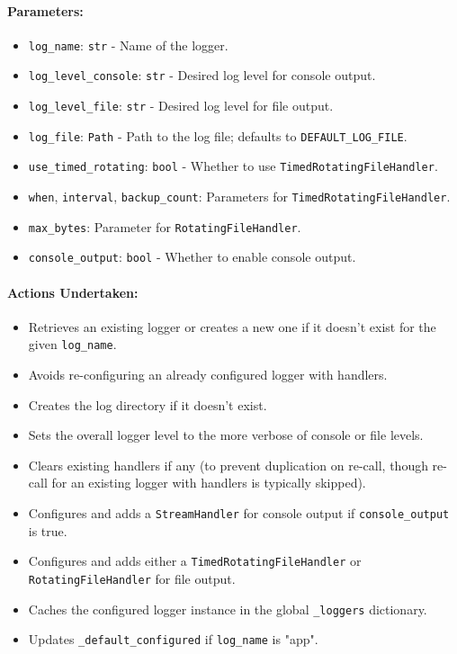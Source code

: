 \documentclass{article}
\begin{document}
\paragraph{Parameters:}
\begin{itemize}
    \item \texttt{log\_name}: \texttt{str} - Name of the logger.
    \item \texttt{log\_level\_console}: \texttt{str} - Desired log level for console output.
    \item \texttt{log\_level\_file}: \texttt{str} - Desired log level for file output.
    \item \texttt{log\_file}: \texttt{Path} - Path to the log file; defaults to \texttt{DEFAULT\_LOG\_FILE}.
    \item \texttt{use\_timed\_rotating}: \texttt{bool} - Whether to use \texttt{TimedRotatingFileHandler}.
    \item \texttt{when}, \texttt{interval}, \texttt{backup\_count}: Parameters for \texttt{TimedRotatingFileHandler}.
    \item \texttt{max\_bytes}: Parameter for \texttt{RotatingFileHandler}.
    \item \texttt{console\_output}: \texttt{bool} - Whether to enable console output.
\end{itemize}
\paragraph{Actions Undertaken:}
\begin{itemize}
    \item Retrieves an existing logger or creates a new one if it doesn't exist for the given \texttt{log\_name}.
    \item Avoids re-configuring an already configured logger with handlers.
    \item Creates the log directory if it doesn't exist.
    \item Sets the overall logger level to the more verbose of console or file levels.
    \item Clears existing handlers if any (to prevent duplication on re-call, though re-call for an existing logger with handlers is typically skipped).
    \item Configures and adds a \texttt{StreamHandler} for console output if \texttt{console\_output} is true.
    \item Configures and adds either a \texttt{TimedRotatingFileHandler} or \texttt{RotatingFileHandler} for file output.
    \item Caches the configured logger instance in the global \texttt{\_loggers} dictionary.
    \item Updates \texttt{\_default\_configured} if \texttt{log\_name} is "app".
\end{itemize}
\end{document}
